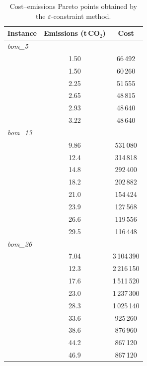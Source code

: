 \begin{table}[!htbp]\centering\small
\caption{Cost--emissions Pareto points obtained by the $\varepsilon$-constraint method.}\label{tab:paretoemis}
\begin{tabular}{lcc}
\toprule
Instance & Emissions (t\,CO$_2$) & Cost\\
\midrule
\multicolumn{3}{l}{\textit{bom\_5}} \\
 & 1.50 & 66\,492 \\
 & 1.50 & 60\,260 \\
 & 2.25 & 51\,555 \\
 & 2.65 & 48\,815 \\
 & 2.93 & 48\,640 \\
 & 3.22 & 48\,640 \\
\midrule
\multicolumn{3}{l}{\textit{bom\_13}} \\
 & 9.86 & 531\,080 \\
 & 12.4 & 314\,818 \\
 & 14.8 & 292\,400 \\
 & 18.2 & 202\,882 \\
 & 21.0 & 154\,424 \\
 & 23.9 & 127\,568 \\
 & 26.6 & 119\,556 \\
 & 29.5 & 116\,448 \\
\midrule
\multicolumn{3}{l}{\textit{bom\_26}} \\
 & 7.04 & 3\,104\,390 \\
 & 12.3 & 2\,216\,150 \\
 & 17.6 & 1\,511\,520 \\
 & 23.0 & 1\,237\,300 \\
 & 28.3 & 1\,025\,140 \\
 & 33.6 & 925\,260 \\
 & 38.6 & 876\,960 \\
 & 44.2 & 867\,120 \\
 & 46.9 & 867\,120 \\
\bottomrule
\end{tabular}
\end{table}
